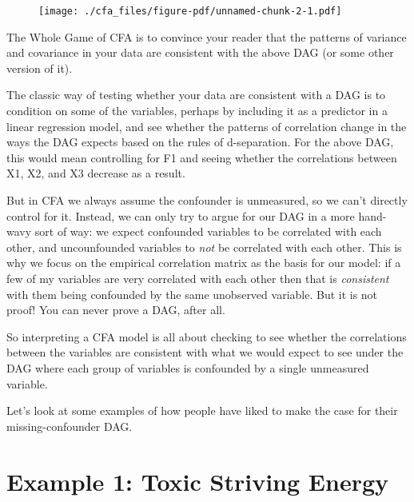 \documentclass[
  letterpaper,
  DIV=11,
  numbers=noendperiod]{scrreprt}
\begin{document}
\begin{figure}[H]

{\centering \texttt{[image: ./cfa\_files/figure-pdf/unnamed-chunk-2-1.pdf]}

}

\end{figure}

The Whole Game of CFA is to convince your reader that the patterns of
variance and covariance in your data are consistent with the above DAG
(or some other version of it).

The classic way of testing whether your data are consistent with a DAG
is to condition on some of the variables, perhaps by including it as a
predictor in a linear regression model, and see whether the patterns of
correlation change in the ways the DAG expects based on the rules of
d-separation. For the above DAG, this would mean controlling for F1 and
seeing whether the correlations between X1, X2, and X3 decrease as a
result.

But in CFA we always assume the confounder is unmeasured, so we can't
directly control for it. Instead, we can only try to argue for our DAG
in a more hand-wavy sort of way: we expect confounded variables to be
correlated with each other, and uncounfounded variables to \emph{not} be
correlated with each other. This is why we focus on the empirical
correlation matrix as the basis for our model: if a few of my variables
are very correlated with each other then that is \emph{consistent} with
them being confounded by the same unobserved variable. But it is not
proof! You can never prove a DAG, after all.

So interpreting a CFA model is all about checking to see whether the
correlations between the variables are consistent with what we would
expect to see under the DAG where each group of variables is confounded
by a single unmeasured variable.

Let's look at some examples of how people have liked to make the case
for their missing-confounder DAG.

\hypertarget{example-1-toxic-striving-energy}{%
\section*{Example 1: Toxic Striving
Energy}\label{example-1-toxic-striving-energy}}

\end{document}
